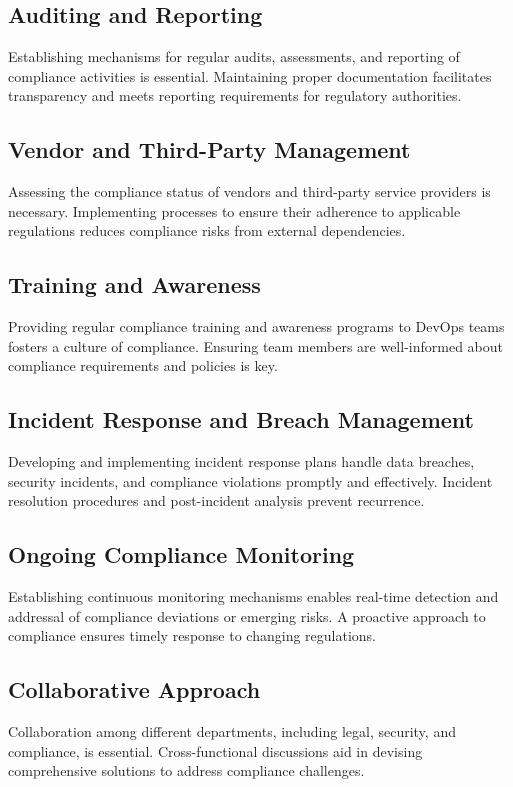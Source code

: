 \documentclass[conference]{IEEEtran}
\begin{document}
\subsection{Auditing and Reporting}
Establishing mechanisms for regular audits, assessments, and reporting of compliance activities is essential. Maintaining proper documentation facilitates transparency and meets reporting requirements for regulatory authorities.

\subsection{Vendor and Third-Party Management}
Assessing the compliance status of vendors and third-party service providers is necessary. Implementing processes to ensure their adherence to applicable regulations reduces compliance risks from external dependencies.

\subsection{Training and Awareness}
Providing regular compliance training and awareness programs to DevOps teams fosters a culture of compliance. Ensuring team members are well-informed about compliance requirements and policies is key.

\subsection{Incident Response and Breach Management}
Developing and implementing incident response plans handle data breaches, security incidents, and compliance violations promptly and effectively. Incident resolution procedures and post-incident analysis prevent recurrence.



\subsection{Ongoing Compliance Monitoring}
Establishing continuous monitoring mechanisms enables real-time detection and addressal of compliance deviations or emerging risks. A proactive approach to compliance ensures timely response to changing regulations.

\subsection{Collaborative Approach}
Collaboration among different departments, including legal, security, and compliance, is essential. Cross-functional discussions aid in devising comprehensive solutions to address compliance challenges.
\end{document}
